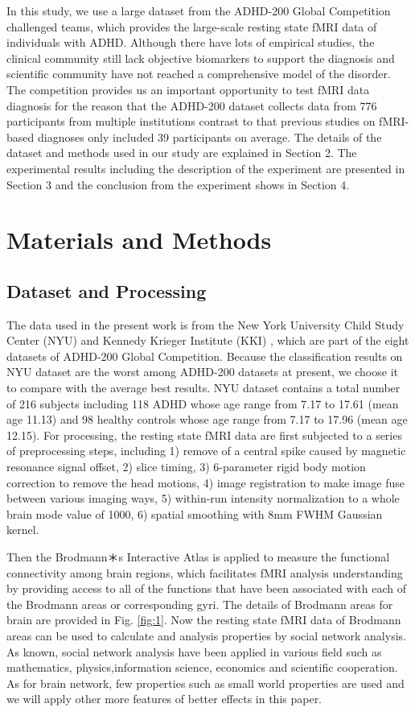 \documentclass{llncs}
\begin{document}
In this study, we use a large dataset from the ADHD-200 Global Competition challenged teams, which provides the large-scale resting state fMRI data of individuals with ADHD. Although there have lots of empirical studies, the clinical community still lack objective biomarkers to support the diagnosis and scientific community have not reached a comprehensive model of the disorder. The competition provides us an important opportunity to test fMRI data diagnosis for the reason that the ADHD-200 dataset collects data from 776 participants from multiple institutions contrast to that previous studies on fMRI-based diagnoses only included 39 participants on average\cite{9}. The details of the dataset and methods used in our study are explained in Section 2. The experimental results including the description of the experiment are presented in Section 3 and the conclusion from the experiment shows in Section 4.


\section{Materials and Methods}

%
\subsection{Dataset and Processing}
%
The data used in the present work is from the New York University Child Study Center (NYU) and Kennedy Krieger Institute (KKI) , which are part of the eight datasets of ADHD-200 Global Competition. Because the classification results on NYU dataset are the worst among ADHD-200 datasets at present, we choose it to compare with the average best results. NYU dataset contains a total number of 216 subjects including 118 ADHD whose age range from 7.17 to 17.61 (mean age 11.13) and 98 healthy controls whose age range from 7.17 to 17.96 (mean age 12.15). For processing, the resting state fMRI data are first subjected to a series of preprocessing steps, including 1) remove of a central spike caused by magnetic resonance signal offset, 2) slice timing,  3) 6-parameter rigid body motion correction to remove the head motions, 4) image registration to make image fuse between various imaging ways, 5) within-run intensity normalization to a whole brain mode value of 1000, 6) spatial smoothing with 8mm FWHM Gaussian kernel\cite{10}.


Then the Brodmann＊s Interactive Atlas is applied to measure the functional connectivity among brain regions, which facilitates fMRI analysis understanding by providing access to all of the functions that have been associated with each of the Brodmann areas or corresponding gyri\cite{11}. The details of Brodmann areas for brain are provided in Fig. \ref{fig:1}. Now the resting state fMRI data of  Brodmann areas can be used to calculate and analysis properties by social network analysis. As known, social network analysis have been applied in various field such as mathematics, physics,information science, economics and scientific cooperation\cite{12}. As for brain network, few properties such as small world properties are used and we will apply other more features of better effects in this paper.
\end{document}
